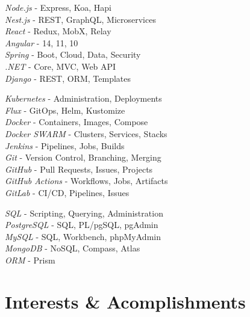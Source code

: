 \documentclass[10pt]{article} %
\begin{document}
{
    \textit{Node.js} - Express, Koa, Hapi\\
    \textit{Nest.js} - REST, GraphQL, Microservices\\
    \textit{React} - Redux, MobX, Relay\\
    \textit{Angular} - 14, 11, 10\\
    \textit{Spring} - Boot, Cloud, Data, Security\\
    \textit{.NET} - Core, MVC, Web API\\
    \textit{Django} - REST, ORM, Templates\\
}


{
    \textit{Kubernetes} - Administration, Deployments\\
    \textit{Flux} - GitOps, Helm, Kustomize\\
    \textit{Docker} - Containers, Images, Compose\\
    \textit{Docker SWARM} - Clusters, Services, Stacks\\
    \textit{Jenkins} - Pipelines, Jobs, Builds\\
    \textit{Git} - Version Control, Branching, Merging\\
    \textit{GitHub} - Pull Requests, Issues, Projects\\
    \textit{GitHub Actions} - Workflows, Jobs, Artifacts\\
    \textit{GitLab} - CI/CD, Pipelines, Issues\\

}

{
    \textit{SQL} - Scripting, Querying, Administration\\
    \textit{PostgreSQL} - SQL, PL/pgSQL, pgAdmin\\
    \textit{MySQL} - SQL, Workbench, phpMyAdmin\\
    \textit{MongoDB} - NoSQL, Compass, Atlas\\
    \textit{ORM} - Prism\\
}


\section{Interests \& Acomplishments}
\end{document}
